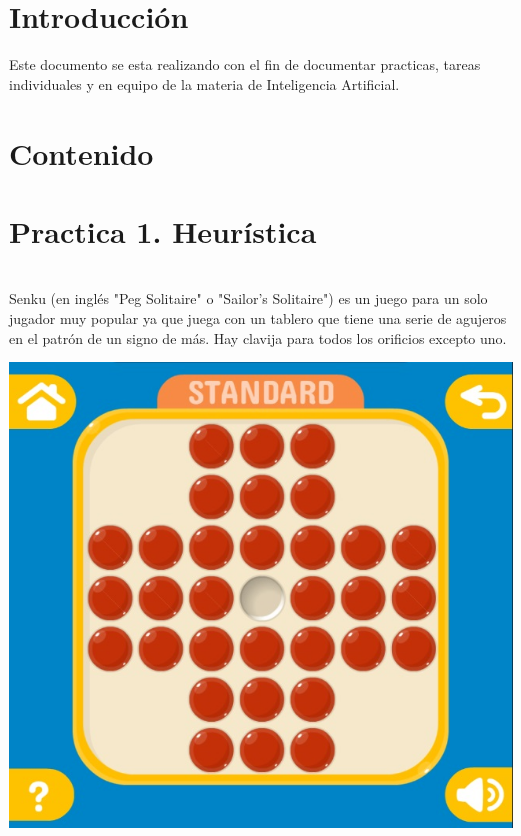 \documentclass[10pt,a4paper]{report}
\begin{document}
\pagebreak 

\section*{Introducción}
Este documento se esta realizando con el fin de documentar practicas, tareas individuales y en equipo de la materia de Inteligencia Artificial.\\ 

\pagebreak 

\section*{Contenido}
\section*{Practica 1. Heurística}
{}\\

Senku (en inglés "Peg Solitaire" o "Sailor's Solitaire") es un juego para un solo jugador muy popular ya que juega con un tablero que tiene una serie de agujeros en el patrón de un signo de más. Hay clavija para todos los orificios excepto uno.\\

\begin{center}
	\includegraphics[scale=.3]{initialState.jpg} \hspace{6cm} 
\end{center}
\end{document}

